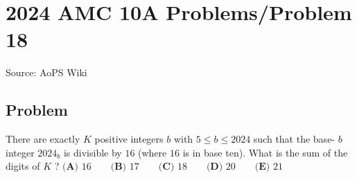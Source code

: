 \documentclass[12pt]{article}
\begin{document}
\section*{{2024 AMC 10A Problems/Problem 18}}
Source: AoPS Wiki

\subsection*{Problem}
There are exactly $K$ positive integers $b$ with $5 \leq b \leq 2024$ such that the base- $b$ integer $2024_b$ is divisible by $16$ (where $16$ is in base ten). What is the sum of the digits of $K$ ? $\textbf{(A) }16\qquad\textbf{(B) }17\qquad\textbf{(C) }18\qquad\textbf{(D) }20\qquad\textbf{(E) }21$
\end{document}
